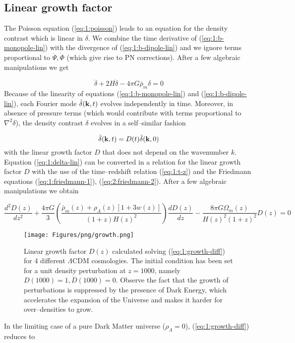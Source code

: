 \subsection{Linear growth factor}
The Poisson equation (\ref{eq:1:poisson}) leads to an equation for the density contrast which is linear in $\delta$. We combine the time derivative of (\ref{eq:1:b-monopole-lin}) with the divergence of (\ref{eq:1:b-dipole-lin}) and we ignore terms proportional to $\dot{\Psi},\dot{\Phi}$ (which give rise to PN corrections). After a few algebraic manipulations we get 

\begin{equation}
\label{eq:1:delta-lin}
\ddot{\delta} + 2H\dot{\delta} - 4\pi G\bar{\rho}_m\delta = 0  
\end{equation} 
%
Because of the linearity of equations (\ref{eq:1:b-monopole-lin}) and (\ref{eq:1:b-dipole-lin}), each Fourier mode $\tilde{\delta}(\mathbf{k},t)$ evolves independently in time. Moreover, in absence of pressure terms (which would contribute with terms proportional to $\nabla^2\delta$), the density contrast $\delta$ evolves in a  self--similar fashion

\begin{equation}
\label{eq:1:selfsim}
\tilde{\delta}(\mathbf{k},t) = D(t)\tilde{\delta}(\mathbf{k},0)
\end{equation}
%
with the linear growth factor $D$ that does not depend on the wavenumber $k$. Equation (\ref{eq:1:delta-lin}) can be converted in a relation for the linear growth factor $D$ with the use of the time--redshift relation (\ref{eq:1:t-z}) and the Friedmann equations (\ref{eq:1:friedmann-1}), (\ref{eq:2:friedmann-2}). After a few algebraic manipulations we obtain

\begin{equation}
\label{eq:1:growth-diff}
\frac{d^2D(z)}{dz^2} + \frac{4\pi G}{3}\left(\frac{\bar{\rho}_m(z)+\rho_\Lambda(z)[1+3w(z)]}{(1+z)H(z)^2}\right)\frac{dD(z)}{dz} -\frac{8\pi G\Omega_m(z)}{H(z)^2(1+z)^2}D(z)= 0
\end{equation}
%
\begin{figure}
\begin{center}
\texttt{[image: Figures/png/growth.png]}
\end{center}
\caption{Linear growth factor $D(z)$ calculated solving (\ref{eq:1:growth-diff}) for 4 different $\Lambda$CDM cosmologies. The initial condition has been set for a unit density perturbation at $z=1000$, namely $D(1000)=1, \dot{D}(1000)=0$. Observe the fact that the growth of perturbations is suppressed by the presence of Dark Energy, which accelerates the expansion of the Universe and makes it harder for over--densities to grow.}
\label{fig:1:growth}
\end{figure}
%
In the limiting case of a pure Dark Matter universe ($\rho_\Lambda=0$), (\ref{eq:1:growth-diff}) reduces to


